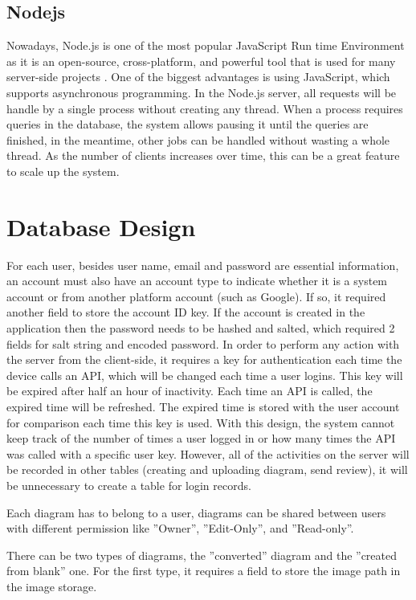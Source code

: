 \subsection{Nodejs}
Nowadays, Node.js is one of the most popular JavaScript Run time Environment as it is an open-source, cross-platform, and powerful tool that is used for many server-side projects \cite{59}. One of the biggest advantages is using JavaScript, which supports asynchronous programming. In the Node.js server, all requests will be handle by a single process without creating any thread. When a process requires queries in the database, the system allows pausing it until the queries are finished, in the meantime, other jobs can be handled without wasting a whole thread. As the number of clients increases over time, this can be a great feature to scale up the system.

\section{Database Design}

For each user, besides user name, email and password are essential information, an account must also have an account type to indicate whether it is a system account or from another platform account (such as Google). If so, it required another field to store the account ID key. If the account is created in the application then the password needs to be hashed and salted, which required 2 fields for salt string and encoded password. In order to perform any action with the server from the client-side, it requires a key for authentication each time the device calls an API, which will be changed each time a user logins. This key will be expired after half an hour of inactivity. Each time an API is called, the expired time will be refreshed. The expired time is stored with the user account for comparison each time this key is used. With this design, the system cannot keep track of the number of times a user logged in or how many times the API was called with a specific user key. However, all of the activities on the server will be recorded in other tables (creating and uploading diagram, send review), it will be unnecessary to create a table for login records.

Each diagram has to belong to a user, diagrams can be shared between users with different permission like ''Owner'', ''Edit-Only'', and ''Read-only''.

There can be two types of diagrams,  the ''converted'' diagram and the ''created from blank'' one. For the first type, it requires a field to store the image path in the image storage.

